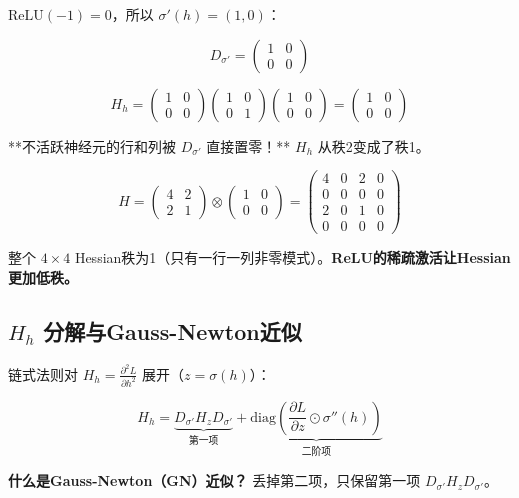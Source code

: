 \documentclass[12pt,a4paper]{article}
\begin{document}
$\text{ReLU}(-1) = 0$，所以 $\sigma'(h) = (1, 0)$：


\[D_{\sigma'} = \begin{pmatrix}1&0\\0&0\end{pmatrix}\]


\[H_h = \begin{pmatrix}1&0\\0&0\end{pmatrix} \begin{pmatrix}1&0\\0&1\end{pmatrix} \begin{pmatrix}1&0\\0&0\end{pmatrix} = \begin{pmatrix}1&0\\0&0\end{pmatrix}\]

**不活跃神经元的行和列被 $D_{\sigma'}$ 直接置零！** $H_h$ 从秩2变成了秩1。


\[H = \begin{pmatrix}4&2\\2&1\end{pmatrix} \otimes \begin{pmatrix}1&0\\0&0\end{pmatrix} = \begin{pmatrix}4&0&2&0\\0&0&0&0\\2&0&1&0\\0&0&0&0\end{pmatrix}\]

整个 $4 \times 4$ Hessian秩为1（只有一行一列非零模式）。\textbf{ReLU的稀疏激活让Hessian更加低秩。}


\subsection{$H_h$ 分解与Gauss-Newton近似}

链式法则对 $H_h = \frac{\partial^2 L}{\partial h^2}$ 展开（$z = \sigma(h)$）：


\[H_h = \underbrace{D_{\sigma'} H_z D_{\sigma'}}_{\text{第一项}} + \underbrace{\text{diag}\!\left(\frac{\partial L}{\partial z} \odot \sigma''(h)\right)}_{\text{二阶项}}\]

\textbf{什么是Gauss-Newton（GN）近似？} 丢掉第二项，只保留第一项 $D_{\sigma'} H_z D_{\sigma'}$。
\end{document}

